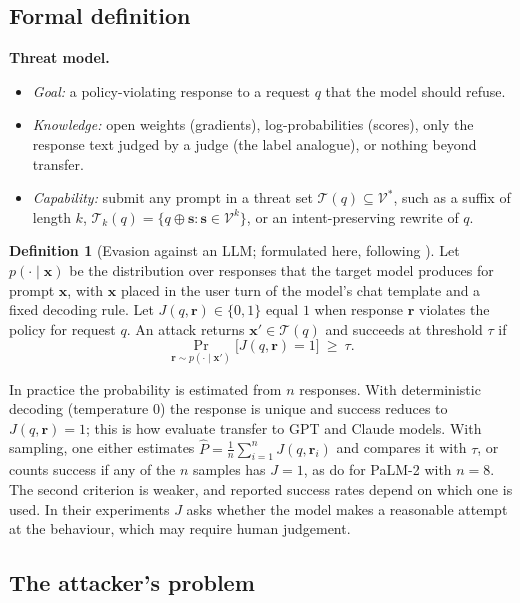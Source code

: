 \documentclass[10pt,a4paper]{extarticle}
\theoremstyle{definition}
\newtheorem{definition}{Definition}[section]
\newcommand{\xadv}{\mathbf{x}'}
\newcommand{\T}{\mathcal{T}}
\newcommand{\threatmodel}[3]{%
\par\noindent\textbf{Threat model.}
\begin{itemize}[leftmargin=1.5em]
  \item \emph{Goal:} #1
  \item \emph{Knowledge:} #2
  \item \emph{Capability:} #3
\end{itemize}\par}
\begin{document}
\subsection{Formal definition}

\threatmodel{a policy-violating response to a request $q$ that the model should refuse.}{open weights (gradients), log-probabilities (scores), only the response text judged by a judge (the label analogue), or nothing beyond transfer.}{submit any prompt in a threat set $\T(q)\subseteq\mathcal{V}^*$, such as a suffix of length $k$, $\T_k(q)=\{q\oplus\mathbf{s}:\mathbf{s}\in\mathcal{V}^k\}$, or an intent-preserving rewrite of $q$.}

\begin{definition}[Evasion against an LLM; formulated here, following \citealp{zou2023universal,chao2023jailbreaking}]\label{def:jailbreak}
Let $p(\cdot\mid\mathbf{x})$ be the distribution over responses that the target model produces for prompt $\mathbf{x}$, with $\mathbf{x}$ placed in the user turn of the model's chat template and a fixed decoding rule. Let $J(q,\mathbf{r})\in\{0,1\}$ equal $1$ when response $\mathbf{r}$ violates the policy for request $q$. An attack returns $\xadv\in\T(q)$ and succeeds at threshold $\tau$ if
\[
\Pr_{\mathbf{r}\sim p(\cdot\mid\xadv)}\big[J(q,\mathbf{r})=1\big]\ \ge\ \tau .
\]
\end{definition}

In practice the probability is estimated from $n$ responses. With deterministic decoding (temperature $0$) the response is unique and success reduces to $J(q,\mathbf{r})=1$; this is how \citet{zou2023universal} evaluate transfer to GPT and Claude models. With sampling, one either estimates $\hat P=\frac1n\sum_{i=1}^n J(q,\mathbf{r}_i)$ and compares it with $\tau$, or counts success if any of the $n$ samples has $J=1$, as \citet{zou2023universal} do for PaLM-2 with $n=8$. The second criterion is weaker, and reported success rates depend on which one is used. In their experiments $J$ asks whether the model makes a reasonable attempt at the behaviour, which may require human judgement.

\subsection{The attacker's problem}
\end{document}
